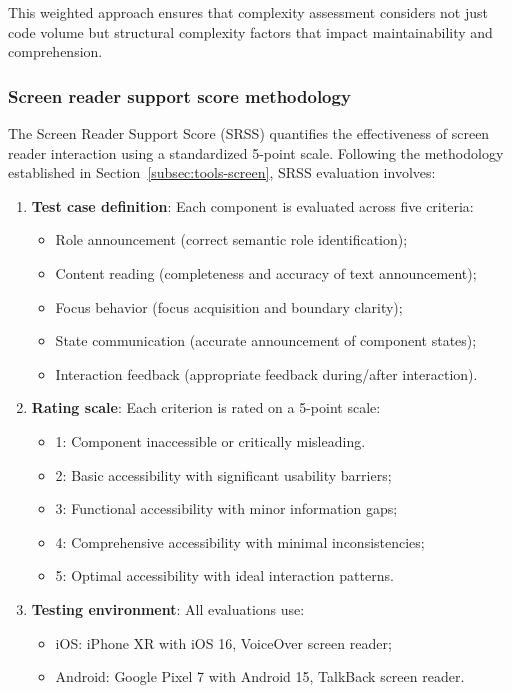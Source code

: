 This weighted approach ensures that complexity assessment considers not just code volume but structural complexity factors that impact maintainability and comprehension.

\subsubsection{Screen reader support score methodology}
\label{subsubsec:srss-methodology}

The Screen Reader Support Score (SRSS) quantifies the effectiveness of screen reader interaction using a standardized 5-point scale. Following the methodology established in Section~\ref{subsec:tools-screen}, SRSS evaluation involves:

\begin{enumerate}
    \item \textbf{Test case definition}: Each component is evaluated across five criteria:
    \begin{itemize}
        \item Role announcement (correct semantic role identification);
        \item Content reading (completeness and accuracy of text announcement);
        \item Focus behavior (focus acquisition and boundary clarity);
        \item State communication (accurate announcement of component states);
        \item Interaction feedback (appropriate feedback during/after interaction).
    \end{itemize}
    
    \item \textbf{Rating scale}: Each criterion is rated on a 5-point scale:
    \begin{itemize}
        \item 1: Component inaccessible or critically misleading.
        \item 2: Basic accessibility with significant usability barriers;
        \item 3: Functional accessibility with minor information gaps;
        \item 4: Comprehensive accessibility with minimal inconsistencies;
        \item 5: Optimal accessibility with ideal interaction patterns.
    \end{itemize}
    
    \item \textbf{Testing environment}: All evaluations use:
    \begin{itemize}
        \item iOS: iPhone XR with iOS 16, VoiceOver screen reader;
        \item Android: Google Pixel 7 with Android 15, TalkBack screen reader.
    \end{itemize}
    

\end{enumerate}
